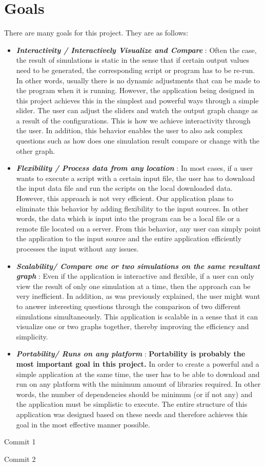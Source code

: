\section*{Goals}

There are many goals for this project. They are as follows:

\begin{itemize}
    \item \textbf{\textit{Interactivity / Interactively Visualize and Compare} }: Often the case, the result of simulations is static in the sense that if certain output values need to be generated, the corresponding script or program has to be re-run. In other words, usually there is no dynamic adjustments that can be made to the program when it is running. However, the application being designed in this project achieves this in the simplest and powerful ways through a simple slider. The user can adjust the sliders and watch the output graph change as a result of the configurations. This is how we achieve interactivity through the user. In addition, this behavior enables the user to also ask complex questions such as how does one simulation result compare or change with the other graph.
    
    \item \textbf{\textit{Flexibility / Process data from any location} }: In most cases, if a user wants to execute a script with a certain input file, the user has to download the input data file and run the scripts on the local downloaded data. However, this approach is not very efficient. Our application plans to eliminate this behavior by adding flexibility to the input sources. In other words, the data which is input into the program can be a local file or a remote file located on a server. From this behavior, any user can simply point the application to the input source and the entire application efficiently processes the input without any issues. 
    
    \item \textbf{\textit{Scalability/ Compare one or two simulations on the same resultant graph} }: Even if the application is interactive and flexible, if a user can only view the result of only one simulation at a time, then the approach can be very inefficient. In addition, as was previously explained, the user might want to answer interesting questions through the comparison of two different simulations simultaneously. This application is scalable in a sense that it can visualize one or two graphs together, thereby improving the efficiency and simplicity. 
    
    \item \textbf{\textit{Portability/ Runs on any platform} }: \textbf{Portability is probably the most important goal in this project.} In order to create a powerful and a simple application at the same time, the user has to be able to download and run on any platform with the minimum amount of libraries required. In other words, the number of dependencies should be minimum (or if not any) and the application must be simplistic to execute. The entire structure of this application was designed based on these needs and therefore achieves this goal in the most effective manner possible.   
\end{itemize}


Commit 1

Commit 2
